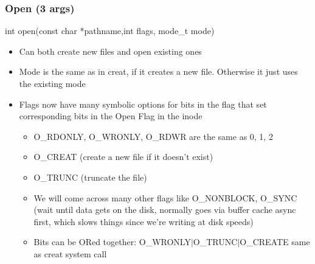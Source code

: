 \subsubsection{Open (3 args)}
int open(const char *pathname,int flags, mode\_t mode)
\begin{itemize}
    \item Can both create new files and open existing ones
    \item Mode is the same as in creat, if it creates a new file. Otherwise it just uses the existing mode
    \item Flags now have many symbolic options for bits in the flag that set corresponding bits in the Open Flag in the inode
    \begin{itemize}
        \item O\_RDONLY, O\_WRONLY, O\_RDWR are the same as 0, 1, 2
        \item O\_CREAT (create a new file if it doesn't exist)
        \item O\_TRUNC (truncate the file)
        \item We will come across many other flags like O\_NONBLOCK, O\_SYNC (wait until data gets on the disk, normally goes via buffer cache async first, which slows things since we're writing at disk speeds)
        \item Bits can be ORed together: O\_WRONLY$\mid$O\_TRUNC$\mid$O\_CREATE same as creat system call
    \end{itemize}
\end{itemize}

